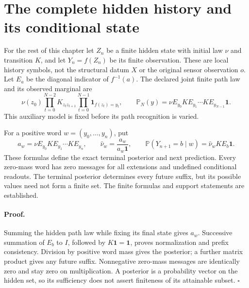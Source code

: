 \section{The complete hidden history and its conditional state}
\label{sec:rg-memory-hidden-history}

For the rest of this chapter let \(Z_n\) be a finite hidden state with
initial law \(\nu\) and transition \(K\), and let
\(Y_n=f(Z_n)\) be its finite observation. These are local history symbols,
not the structural datum \(X\) or the original sensor observation \(o\).
Let \(E_a\) be the diagonal indicator of \(f^{-1}(a)\). The declared
joint finite path law and its observed marginal are
\begin{equation}
 \nu(z_0)\prod_{t=0}^{N-2}K_{z_tz_{t+1}}
       \prod_{t=0}^{N-1}\mathbf1_{f(z_t)=y_t},\qquad
 \mathbb P_N(y)=\nu E_{y_0}K E_{y_1}\cdots K E_{y_{N-1}}\mathbf1.
\label{eq:rg-memory-hidden-path}
\end{equation}
This auxiliary model is fixed before its path recognition is varied.

For a positive word \(w=(y_0,\ldots,y_n)\), put
\begin{equation}
 a_w=\nu E_{y_0}K E_{y_1}\cdots K E_{y_n},\qquad
 \widehat\nu_w=\frac{a_w}{a_w\mathbf1},\qquad
 \mathbb P(Y_{n+1}=b\mid w)=\widehat\nu_wK E_b\mathbf1.
\label{eq:rg-memory-filter}
\end{equation}
These formulas define the exact terminal posterior and next prediction.
Every zero-mass word has zero messages for all extensions and undefined
conditional readouts. The terminal posterior determines every future suffix,
but its possible values need not form a finite set. The finite formulas and
support statements are established. 

\paragraph{Proof.}
Summing the hidden path law while fixing its final state gives \(a_w\).
Successive summation of \(E_b\) to \(I\), followed by \(K\mathbf1
=\mathbf1\), proves normalization and prefix consistency. Division by
positive word mass gives the posterior; a further matrix product gives any
future suffix. Nonnegative zero-mass messages are identically zero and stay
zero on multiplication. A posterior is a probability vector on the hidden
set, so its sufficiency does not assert finiteness of its attainable subset.
\(\square\)

